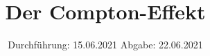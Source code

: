 

\subject{V603}
\title{Der Compton-Effekt}
\date{%
  Durchführung: 15.06.2021
  \hspace{3em}
  Abgabe: 22.06.2021
}



\maketitle
\thispagestyle{empty}
\tableofcontents
\newpage






\printbibliography{}


